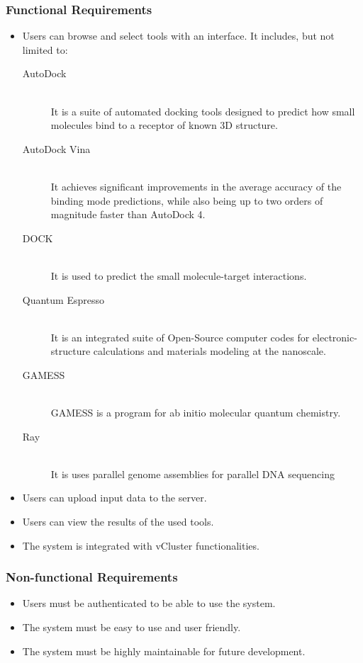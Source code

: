 \documentclass[journal]{./IEEE/IEEEtran}
\begin{document}
        \subsubsection{Functional Requirements}
        \begin{itemize}
          \item Users can browse and select tools with an interface. It includes, but not limited to:
          \begin{description}
          	\item[AutoDock] \hfill \\ 
            It is a suite of automated docking tools designed to predict how small molecules bind to a receptor of known 3D structure. \cite{morris2009autodock4}
            \item[AutoDock Vina] \hfill \\
            It achieves significant improvements in the average accuracy of the binding mode predictions, while also being up to two orders of magnitude faster than AutoDock 4. \cite{JCC:JCC21334}
            \item[DOCK] \hfill \\
            It is used to predict the small molecule-target interactions. \cite{lang2009dock}
            \item[Quantum Espresso] \hfill \\
It is an integrated suite of Open-Source computer codes for electronic-structure calculations and materials modeling at the nanoscale. \cite{QE-2009}
            \item[GAMESS] \hfill \\
            GAMESS is a program for ab initio molecular quantum chemistry. \cite{1993gamess}
            \item[Ray] \hfill \\
            It is uses parallel genome assemblies for parallel DNA sequencing \cite{boisvert_ray_2012}
          \end{description}
          \item Users can upload input data to the server.
          \item Users can view the results of the used tools.
          \item The system is integrated with vCluster functionalities.
        \end{itemize}
        \subsubsection{Non-functional Requirements}
        \begin{itemize}
          \item Users must be authenticated to be able to use the system.
          \item The system must be easy to use and user friendly.
          \item The system must be highly maintainable for future development.
        \end{itemize}
    
\end{document}
